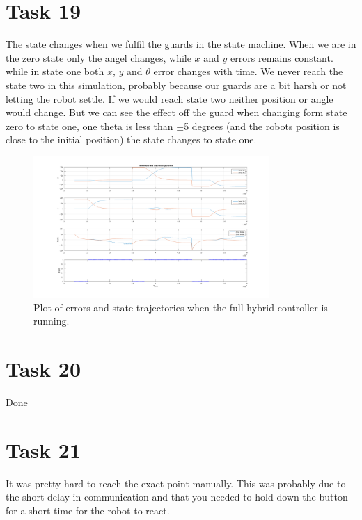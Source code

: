 \documentclass[a4paper,12pt,oneside,onecolumn]{article} %
\begin{document}
\section*{Task 19}

The state changes when we fulfil the guards in the state machine.  When we are in the zero state only the angel changes, while $x$ and $y$ errors remains constant. while in state one both $x$, $y$ and $\theta$ error changes with time. We never reach the state two in this simulation, probably because our guards are a bit harsh or not letting the robot settle. If we would reach state two neither position or angle would change. But we can see the effect off the guard when changing form state zero to state one, one theta is less than $\pm$5 degrees (and the robots position is close to the initial position) the state changes to state one.

\begin{figure}[H]
\begin{center}	
  \includegraphics[width = 0.8\textwidth]{task19b.png}
  \caption{Plot of errors and state trajectories when the full hybrid controller is running.}\label{19}
 \end{center}
\end{figure}

\section*{Task 20}

Done

\section*{Task 21}

It was pretty hard to reach the exact point manually. This was probably due to the short delay in communication and that you needed to hold down the button for a short time for the robot to react.
\end{document}

